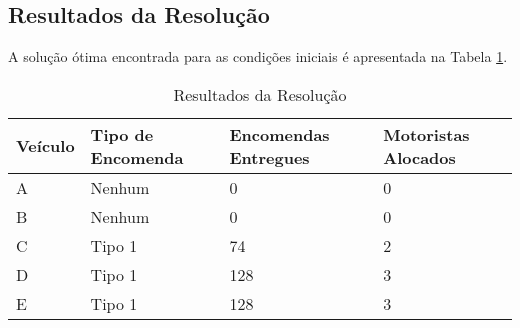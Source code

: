 \subsection{Resultados da Resolução}\label{subsec:resultados-da-resolucao}
A solução ótima encontrada para as condições iniciais é apresentada na Tabela \ref{tab:resultados}.
\begin{table}[H]
    \centering
    \label{tab:resultados}
    \begin{tabular}{@{}llll@{}}
        \midrule
        Veículo & Tipo de Encomenda & Encomendas Entregues & Motoristas Alocados \\ \midrule
        A       & Nenhum            & 0                    & 0                   \\
        B       & Nenhum            & 0                    & 0                   \\
        C       & Tipo 1            & 74                   & 2                   \\
        D       & Tipo 1            & 128                  & 3                   \\
        E       & Tipo 1            & 128                  & 3                   \\ \bottomrule
    \end{tabular}
    \caption{Resultados da Resolução}
\end{table}

